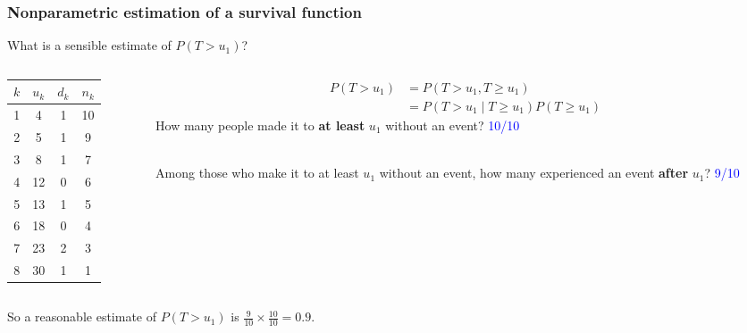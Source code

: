 \documentclass[10pt,t]{beamer}
\begin{document}
\begin{frame}
\frametitle{Nonparametric estimation of a survival function}
What is a sensible estimate of $P(T > u_1)$?

\begin{columns}
	\begin{column}{0.3\textwidth}
		\begin{center}
\begin{tabular}{|c|c|c|c|}
	\hline
	$k$ & $u_k$ & $d_k$ & $n_k$ \\
	\hline
	1 & 4 & 1 & 10 \\
	2& 5 & 1 & 9 \\
	3& 8 & 1 & 7 \\
	4&12 & 0 & 6 \\
	5&13 & 1 & 5 \\
	6&18 & 0 & 4 \\
	7&23 & 2 & 3 \\
	8&30 & 1 & 1 \\
	\hline
\end{tabular}
	\end{center}
	\end{column}
	\begin{column}{0.7\textwidth}  %
		\begin{align*}
			P(T > u_1) &= P(T > u_1, T\geq u_1) \\
			&= P(T > u_1 \mid T \geq u_1)P(T \geq u_1)
		\end{align*}
		How many people made it to \textbf{at least} $u_1$ without an event? \pause \textcolor{blue}{10/10}
		\\ ~\ 
		
		Among those who make it to at least $u_1$ without an event, how many experienced an event \textbf{after} $u_1$? \pause \textcolor{blue}{9/10} 
	\end{column}
\end{columns}
\vspace{0.5cm}
So a reasonable estimate of $P(T > u_1)$ is $\frac{9}{10} \times \frac{10}{10} = 0.9$.
\end{frame}
\end{document}
